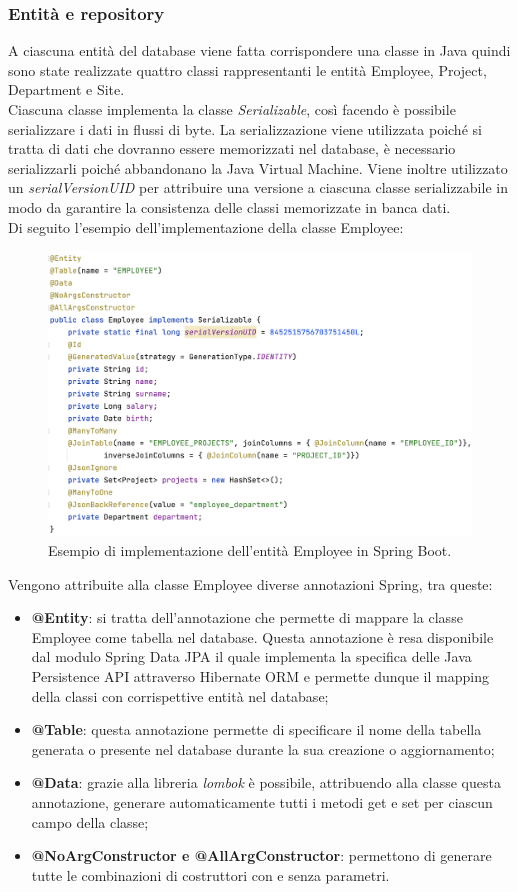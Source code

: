 \subsubsection*{Entità e repository}
A ciascuna entità del database viene fatta corrispondere una classe in Java quindi sono state realizzate quattro classi rappresentanti le entità Employee, Project, Department e Site.\\
Ciascuna classe implementa la classe \textit{Serializable}, così facendo è possibile serializzare i dati in flussi di byte. La serializzazione viene utilizzata poiché si tratta di dati che dovranno essere memorizzati nel database, è necessario serializzarli poiché abbandonano la Java Virtual Machine. Viene inoltre utilizzato un \textit{serialVersionUID} per attribuire una versione a ciascuna classe serializzabile in modo da garantire la consistenza delle classi memorizzate in banca dati.\\
Di seguito l'esempio dell'implementazione della classe Employee:
\FloatBarrier
\begin{figure}[!ht]
\centering
\includegraphics[width=0.9\linewidth]{immagini/employee_entity.png}
\caption{Esempio di implementazione dell'entità Employee in Spring Boot.}
\label{employee-entity-definition}
\end{figure}
\FloatBarrier
Vengono attribuite alla classe Employee diverse annotazioni Spring, tra queste:
\begin{itemize}
  \item \textbf{@Entity}: si tratta dell'annotazione che permette di mappare la classe Employee come tabella nel database. Questa annotazione è resa disponibile dal modulo Spring Data JPA il quale implementa la specifica delle Java Persistence API attraverso Hibernate ORM e permette dunque il mapping della classi con corrispettive entità nel database;
  \item \textbf{@Table}: questa annotazione permette di specificare il nome della tabella generata o presente nel database durante la sua creazione o aggiornamento;
  \item \textbf{@Data}: grazie alla libreria \textit{lombok} è possibile, attribuendo alla classe questa annotazione, generare automaticamente tutti i metodi get e set per ciascun campo della classe;
  \item \textbf{@NoArgConstructor e @AllArgConstructor}: permettono di generare tutte le combinazioni di costruttori con e senza parametri.
\end{itemize}
